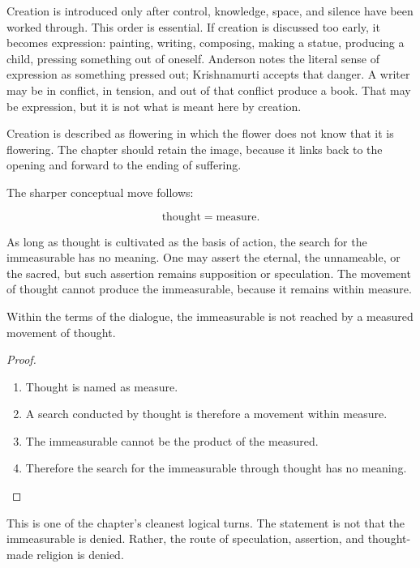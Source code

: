 Creation is introduced only after control, knowledge, space, and silence have been worked through. This order is essential. If creation is discussed too early, it becomes expression: painting, writing, composing, making a statue, producing a child, pressing something out of oneself. Anderson notes the literal sense of expression as something pressed out; Krishnamurti accepts that danger. A writer may be in conflict, in tension, and out of that conflict produce a book. That may be expression, but it is not what is meant here by creation.

Creation is described as flowering in which the flower does not know that it is flowering. The chapter should retain the image, because it links back to the opening and forward to the ending of suffering.

The sharper conceptual move follows:

\begin{equation}
\text{thought} = \text{measure}.
\end{equation}

As long as thought is cultivated as the basis of action, the search for the immeasurable has no meaning. One may assert the eternal, the unnameable, or the sacred, but such assertion remains supposition or speculation. The movement of thought cannot produce the immeasurable, because it remains within measure.

\begin{proposition}
Within the terms of the dialogue, the immeasurable is not reached by a measured movement of thought.
\end{proposition}

\begin{proof}
\begin{enumerate}
\item Thought is named as measure.
\item A search conducted by thought is therefore a movement within measure.
\item The immeasurable cannot be the product of the measured.
\item Therefore the search for the immeasurable through thought has no meaning.
\end{enumerate}
\end{proof}

This is one of the chapter's cleanest logical turns. The statement is not that the immeasurable is denied. Rather, the route of speculation, assertion, and thought-made religion is denied.

